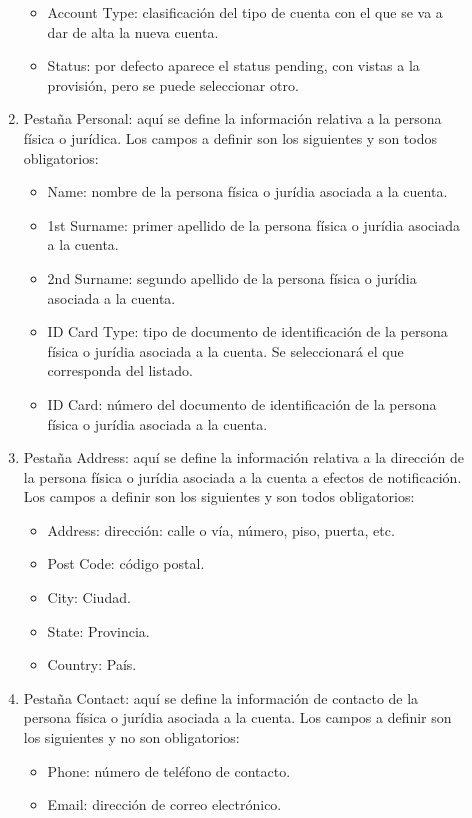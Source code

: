 \begin{description}
\begin{enumerate}
\begin{itemize}
	\item Account Type: clasificación del tipo de cuenta con el que se va a dar de alta la nueva cuenta.
	\item Status: por defecto aparece el status pending, con vistas a la provisión, pero se puede seleccionar otro.
	\end{itemize}
\item Pestaña Personal: aquí se define la información relativa a la persona física o jurídica. Los campos a definir son los siguientes y son todos obligatorios:
	\begin{itemize}
	\item Name: nombre de la persona física o jurídia asociada a la cuenta.
	\item 1st Surname: primer apellido de la persona física o jurídia asociada a la cuenta.
	\item 2nd Surname: segundo apellido de la persona física o jurídia asociada a la cuenta.
	\item ID Card Type: tipo de documento de identificación de la persona física o jurídia asociada a la cuenta. Se seleccionará el que corresponda del listado.
	\item ID Card: número del documento de identificación de la persona física o jurídia asociada a la cuenta.
	\end{itemize}
\item Pestaña Address: aquí se define la información relativa a la dirección de la persona física o jurídia asociada a la cuenta a efectos de notificación. Los campos a definir son los siguientes y son todos obligatorios:
	\begin{itemize}
	\item Address: dirección: calle o vía, número, piso, puerta, etc.
	\item Post Code: código postal.
	\item City: Ciudad.
	\item State: Provincia.
	\item Country: País.
	\end{itemize}
\item Pestaña Contact: aquí se define la información de contacto de la persona física o jurídia asociada a la cuenta. Los campos a definir son los siguientes y no son obligatorios:
	\begin{itemize}
	\item Phone: número de teléfono de contacto.
	\item Email: dirección de correo electrónico.
	\end{itemize}

\end{enumerate}
\end{description}
